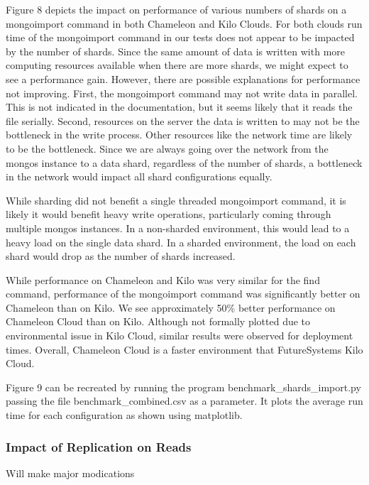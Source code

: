 \documentclass[9pt,twocolumn,twoside]{styles/osajnl}
\begin{document}
Figure 8 depicts the impact on performance of various numbers of shards on a mongoimport command in both Chameleon and Kilo Clouds.  For both clouds run time of the mongoimport command in our tests does not appear to be  impacted by the number of shards.  Since the same amount of data is written with more computing resources available when there are more shards, we might expect to see a performance gain.  However, there are possible explanations for performance not improving.  First, the mongoimport command may not write data in parallel.  This is not indicated in the documentation, but it seems likely that it reads the file serially.  Second, resources on the server the data is written to may not be the bottleneck in the write process.  Other resources like the network time are likely to be the bottleneck.  Since we are always going over the network from the mongos instance to a data shard, regardless of the number of shards, a bottleneck in the network would impact all shard configurations equally.

While sharding did not benefit a single threaded mongoimport command, it is likely it would benefit heavy write operations, particularly coming through multiple mongos instances.  In a non-sharded environment, this would lead to a heavy load on the single data shard.  In a sharded environment, the load on each shard would drop as the number of shards increased.

While performance on Chameleon and Kilo was very similar for the find command, performance of the mongoimport command was significantly better on Chameleon than on Kilo.  We see approximately 50\% better performance on Chameleon Cloud than on Kilo.  Although not formally plotted due to environmental issue in Kilo Cloud, similar results were observed for deployment times.  Overall, Chameleon Cloud is a faster environment that FutureSystems Kilo Cloud.

Figure 9 can be recreated by running the program benchmark\_shards\_import.py passing the file benchmark\_combined.csv as a parameter.  It plots the average run time for each configuration as shown using matplotlib.




\subsubsection{Impact of Replication on Reads}

Will make major modications
\end{document}
